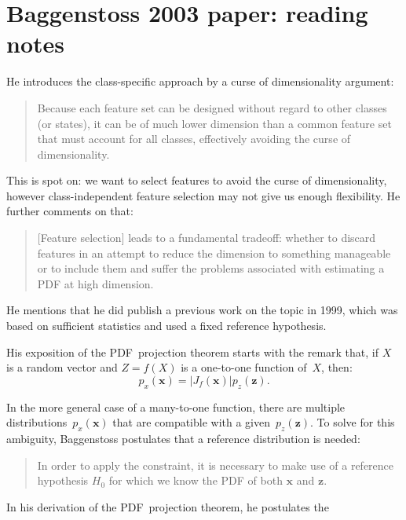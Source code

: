 \documentclass[english]{scrartcl}
\def\x{{\mathbf{x}}}
\def\z{{\mathbf{z}}}
\begin{document}



\appendix

\section{Baggenstoss 2003 paper: reading notes}

He introduces the class-specific approach by a curse of dimensionality argument:
\begin{quote}
Because each feature set can be designed without regard to other classes (or states), it can be of much lower dimension than a common feature set that must account for all classes, effectively avoiding the curse of dimensionality.
\end{quote}

This is spot on: we want to select features to avoid the curse of dimensionality, however class-independent feature selection may not give us enough flexibility. He further comments on that:
\begin{quote}
[Feature selection] leads to a fundamental tradeoff: whether to discard features in an attempt to reduce the dimension to something manageable or to include them and suffer the problems associated with estimating a PDF at high dimension.
\end{quote}

He mentions that he did publish a previous work on the topic in 1999, which was based on sufficient statistics and used a fixed reference hypothesis.

His exposition of the PDF~projection theorem starts with the remark that, if $X$ is a random vector and $Z = f(X)$ is a one-to-one function of~$X$, then:
$$
p_x(\x)
=
|J_f(\x)| p_z(\z)
.
$$

In the more general case of a many-to-one function, there are multiple distributions~$p_x(\x)$ that are compatible with a given~$p_z(\z)$. To solve for this ambiguity, Baggenstoss postulates that a reference distribution is needed:
\begin{quote}
In order to apply the constraint, it is necessary to make use of a reference hypothesis $H_0$ for which we know the PDF of both $\x$ and $\z$.
\end{quote}

In his derivation of the PDF~projection theorem, he postulates the 



\end{document}
